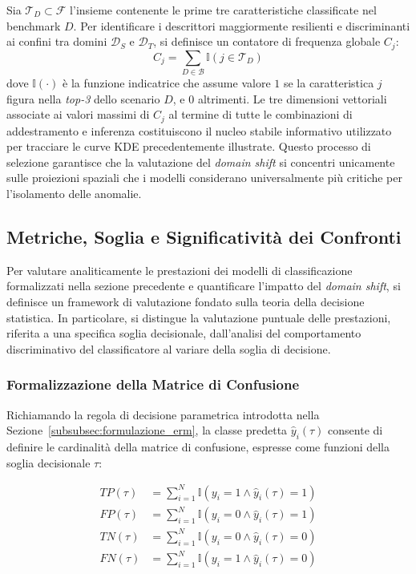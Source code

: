 Sia $\mathcal{T}_D \subset \mathcal{F}$ l'insieme contenente le prime tre caratteristiche classificate nel benchmark $D$. Per identificare i descrittori maggiormente resilienti e discriminanti ai confini tra domini $\mathcal{D}_S$ e $\mathcal{D}_T$, si definisce un contatore di frequenza globale $C_j$:
\begin{equation}
    C_j = \sum_{D \in \mathcal{B}} \mathbb{I}(j \in \mathcal{T}_D)
\end{equation}
dove $\mathbb{I}(\cdot)$ è la funzione indicatrice che assume valore $1$ se la caratteristica $j$ figura nella \textit{top-3} dello scenario $D$, e $0$ altrimenti. 
Le tre dimensioni vettoriali associate ai valori massimi di $C_j$ al termine di tutte le combinazioni di addestramento e inferenza costituiscono il nucleo stabile informativo utilizzato per tracciare le curve KDE precedentemente illustrate. Questo processo di selezione garantisce che la valutazione del \textit{domain shift} si concentri unicamente sulle proiezioni spaziali che i modelli considerano universalmente più critiche per l'isolamento delle anomalie.

\subsection{Metriche, Soglia e Significatività dei Confronti}
\label{subsec:metriche_significativita}

Per valutare analiticamente le prestazioni dei modelli di classificazione formalizzati nella sezione precedente e quantificare l'impatto del \textit{domain shift}, si definisce un framework di valutazione fondato sulla teoria della decisione statistica. In particolare, si distingue la valutazione puntuale delle prestazioni, riferita a una specifica soglia decisionale, dall'analisi del comportamento discriminativo del classificatore al variare della soglia di decisione.

\subsubsection{Formalizzazione della Matrice di Confusione}
\label{subsubsec:decisione_parametrica}
Richiamando la regola di decisione parametrica introdotta nella Sezione~\ref{subsubsec:formulazione_erm}, la classe predetta $\hat{y}_i(\tau)$ consente di definire le cardinalità della matrice di confusione, espresse come funzioni della soglia decisionale $\tau$:

\begin{align}
    TP(\tau) &= \sum_{i=1}^{N} \mathbb{I}(y_i=1 \land \hat{y}_i(\tau)=1) \\
    FP(\tau) &= \sum_{i=1}^{N} \mathbb{I}(y_i=0 \land \hat{y}_i(\tau)=1) \\
    TN(\tau) &= \sum_{i=1}^{N} \mathbb{I}(y_i=0 \land \hat{y}_i(\tau)=0) \\
    FN(\tau) &= \sum_{i=1}^{N} \mathbb{I}(y_i=1 \land \hat{y}_i(\tau)=0)
\end{align}

